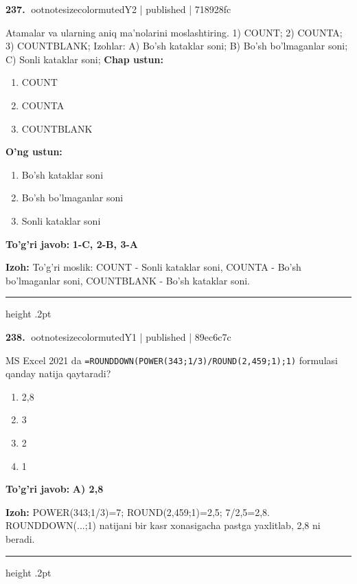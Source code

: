 \documentclass[10pt,a4paper]{article}
\begin{document}
\textbf{\color{ink}237.} {ootnotesizecolor{muted}Y2 | published | 718928fc}
\par
Atamalar va ularning aniq ma'nolarini moslashtiring.  1) COUNT;  2) COUNTA;  3) COUNTBLANK;  Izohlar: A) Bo'sh kataklar soni;  B) Bo'sh bo'lmaganlar soni;  C) Sonli kataklar soni;
\textbf{Chap ustun:}\begin{enumerate}[label=\arabic*),leftmargin=9mm]
\item COUNT
\item COUNTA
\item COUNTBLANK
\end{enumerate}
\textbf{O'ng ustun:}\begin{enumerate}[label=\Alph*),leftmargin=9mm]
\item Bo'sh kataklar soni
\item Bo'sh bo'lmaganlar soni
\item Sonli kataklar soni
\end{enumerate}
\begin{tcolorbox}[enhanced,breakable,colback=teal!4,colframe=teal!55!black,boxrule=0.45pt,arc=1.2mm,left=2.8mm,right=2.8mm,top=2mm,bottom=2mm]
\textbf{\color{teal}To'g'ri javob:} \textbf{1-C, 2-B, 3-A}
\par\smallskip
\textbf{Izoh:} To'g'ri moslik: COUNT - Sonli kataklar soni, COUNTA - Bo'sh bo'lmaganlar soni, COUNTBLANK - Bo'sh kataklar soni.
\end{tcolorbox}
\vspace{2mm}\hrule height .2pt\vspace{2mm}

\textbf{\color{ink}238.} {ootnotesizecolor{muted}Y1 | published | 89ec6c7c}
\par
MS Excel 2021 da \texttt{=ROUNDDOWN(POWER(343;1/3)/ROUND(2,459;1);1)} formulasi qanday natija qaytaradi?
\begin{enumerate}[label=\Alph*),leftmargin=9mm]
\item 2,8
\item 3
\item 2
\item 1
\end{enumerate}
\begin{tcolorbox}[enhanced,breakable,colback=teal!4,colframe=teal!55!black,boxrule=0.45pt,arc=1.2mm,left=2.8mm,right=2.8mm,top=2mm,bottom=2mm]
\textbf{\color{teal}To'g'ri javob:} \textbf{A) 2,8}
\par\smallskip
\textbf{Izoh:} POWER(343;1/3)=7; ROUND(2,459;1)=2,5; 7/2,5=2,8. ROUNDDOWN(...;1) natijani bir kasr xonasigacha pastga yaxlitlab, 2,8 ni beradi.
\end{tcolorbox}
\vspace{2mm}\hrule height .2pt\vspace{2mm}
\end{document}
